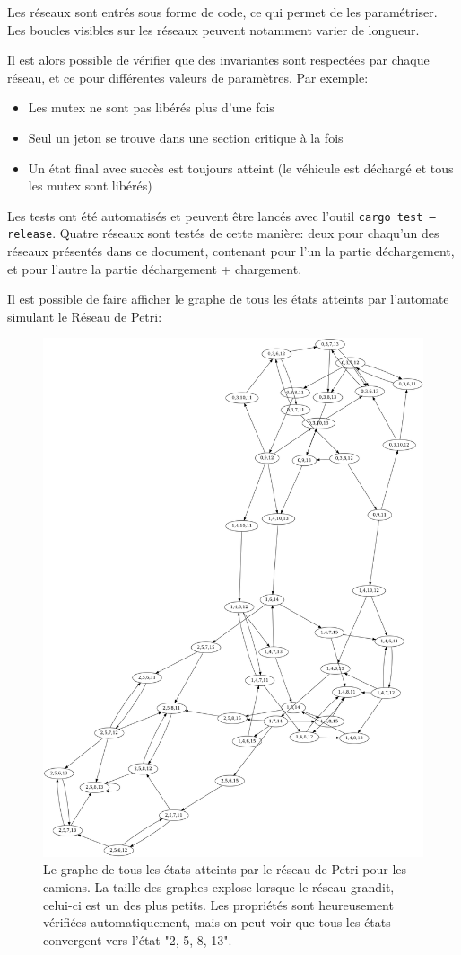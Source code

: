 \documentclass[12pt]{article}
\begin{document}
Les réseaux sont entrés sous forme de code, ce qui permet de les paramétriser.
Les boucles visibles sur les réseaux peuvent notamment varier de longueur.

Il est alors possible de vérifier que des invariantes sont respectées par chaque réseau, et ce pour différentes valeurs de paramètres. Par exemple:

\begin{itemize}
    \item Les mutex ne sont pas libérés plus d'une fois
    \item Seul un jeton se trouve dans une section critique à la fois
    \item Un état final avec succès est toujours atteint (le véhicule est déchargé et tous les mutex sont libérés)
\end{itemize}

Les tests ont été automatisés et peuvent être lancés avec l'outil \texttt{cargo test --release}.
Quatre réseaux sont testés de cette manière: deux pour chaqu'un des réseaux présentés dans ce document, contenant pour l'un la partie déchargement, et pour l'autre la partie déchargement + chargement.

Il est possible de faire afficher le graphe de tous les états atteints par l'automate simulant le Réseau de Petri:

\begin{figure}[H]
    \centering
    \includegraphics[width=0.5\columnwidth]{petri-graph.png}
    \caption{Le graphe de tous les états atteints par le réseau de Petri pour les camions. La taille des graphes explose lorsque le réseau grandit, celui-ci est un des plus petits. Les propriétés sont heureusement vérifiées automatiquement, mais on peut voir que tous les états convergent vers l'état "2, 5, 8, 13".\label{fig:petri-graph}}
\end{figure}
\end{document}
